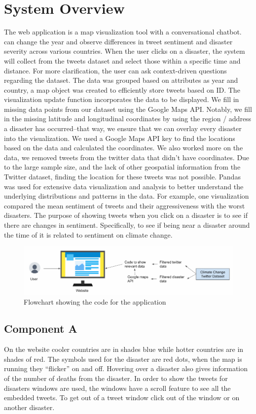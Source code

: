 \documentclass[pdflatex,sn-mathphys-num]{sn-jnl}%
\theoremstyle{thmstyleone}%
\theoremstyle{thmstyletwo}%
\theoremstyle{thmstylethree}%
\begin{document}
\section{System Overview}\label{sec3}
The web application is a map visualization tool with a conversational chatbot. can change the year and observe differences in tweet sentiment and disaster severity  across various countries. When the user clicks on a disaster, the system will collect from the tweets dataset and select those within a specific time and distance.  For more clarification, the user can ask context-driven questions regarding the dataset.
The data was grouped based on attributes as year and country, a map object was created to efficiently store tweets based on ID. The visualization update function incorporates the data to be displayed. We fill in missing data points from our dataset using the Google Maps API. Notably, we fill in the missing latitude and longitudinal coordinates by using the region / address a disaster has occurred–that way, we ensure that we can overlay every disaster into the visualization. We used a Google Maps API key to find the locations based on the data and calculated the coordinates. We also worked more on the data, we removed tweets from the twitter data that didn’t have coordinates. Due to the large sample size, and the lack of other geospatial information from the Twitter dataset, finding the location for these tweets was not possible.
Pandas was used for extensive data visualization and analysis  to better understand the underlying distributions and patterns in the data. For example, one visualization  compared the mean sentiment of tweets and their aggressiveness with the worst disasters. The purpose of showing tweets when you click on a disaster is to see if there are changes in sentiment. Specifically, to see if being near a disaster around the time of it is related to sentiment on climate change.

\begin{figure}[h]
\centering
\includegraphics[width=12cm]{images/climatechangepulse.PNG}
\caption{Flowchart showing the code for the application}
\end{figure}

\subsection{Component A}\label{subsec7}
On the website cooler countries are in shades blue while hotter countries are in shades of red. The symbols used for the disaster are red dots, when the map is running they “flicker” on and off. Hovering over a disaster also gives information of the number of deaths from the disaster. In order to show the tweets for disasters windows are used, the windows have a scroll feature to see all the embedded tweets. To get out of a tweet window click out of the window or on another disaster.
\end{document}
